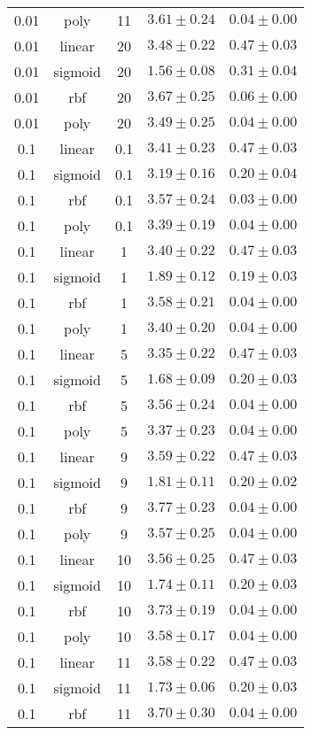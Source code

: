 \begin{tabular}{cccrr}
0.01 & poly & 11 & $3.61 \pm 0.24$ & $0.04 \pm 0.00$\\
0.01 & linear & 20 & $3.48 \pm 0.22$ & $0.47 \pm 0.03$\\
0.01 & sigmoid & 20 & $1.56 \pm 0.08$ & $0.31 \pm 0.04$\\
0.01 & rbf & 20 & $3.67 \pm 0.25$ & $0.06 \pm 0.00$\\
0.01 & poly & 20 & $3.49 \pm 0.25$ & $0.04 \pm 0.00$\\
0.1 & linear & 0.1 & $3.41 \pm 0.23$ & $0.47 \pm 0.03$\\
0.1 & sigmoid & 0.1 & $3.19 \pm 0.16$ & $0.20 \pm 0.04$\\
0.1 & rbf & 0.1 & $3.57 \pm 0.24$ & $0.03 \pm 0.00$\\
0.1 & poly & 0.1 & $3.39 \pm 0.19$ & $0.04 \pm 0.00$\\
0.1 & linear & 1 & $3.40 \pm 0.22$ & $0.47 \pm 0.03$\\
0.1 & sigmoid & 1 & $1.89 \pm 0.12$ & $0.19 \pm 0.03$\\
0.1 & rbf & 1 & $3.58 \pm 0.21$ & $0.04 \pm 0.00$\\
0.1 & poly & 1 & $3.40 \pm 0.20$ & $0.04 \pm 0.00$\\
0.1 & linear & 5 & $3.35 \pm 0.22$ & $0.47 \pm 0.03$\\
0.1 & sigmoid & 5 & $1.68 \pm 0.09$ & $0.20 \pm 0.03$\\
0.1 & rbf & 5 & $3.56 \pm 0.24$ & $0.04 \pm 0.00$\\
0.1 & poly & 5 & $3.37 \pm 0.23$ & $0.04 \pm 0.00$\\
0.1 & linear & 9 & $3.59 \pm 0.22$ & $0.47 \pm 0.03$\\
0.1 & sigmoid & 9 & $1.81 \pm 0.11$ & $0.20 \pm 0.02$\\
0.1 & rbf & 9 & $3.77 \pm 0.23$ & $0.04 \pm 0.00$\\
0.1 & poly & 9 & $3.57 \pm 0.25$ & $0.04 \pm 0.00$\\
0.1 & linear & 10 & $3.56 \pm 0.25$ & $0.47 \pm 0.03$\\
0.1 & sigmoid & 10 & $1.74 \pm 0.11$ & $0.20 \pm 0.03$\\
0.1 & rbf & 10 & $3.73 \pm 0.19$ & $0.04 \pm 0.00$\\
0.1 & poly & 10 & $3.58 \pm 0.17$ & $0.04 \pm 0.00$\\
0.1 & linear & 11 & $3.58 \pm 0.22$ & $0.47 \pm 0.03$\\
0.1 & sigmoid & 11 & $1.73 \pm 0.06$ & $0.20 \pm 0.03$\\
0.1 & rbf & 11 & $3.70 \pm 0.30$ & $0.04 \pm 0.00$\\

\end{tabular}
